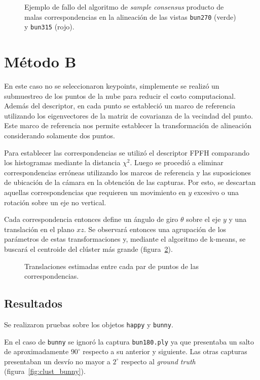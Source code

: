 			\begin{figure}
				\caption{\label{fig:align_sac}Ejemplo de fallo del algoritmo de \emph{sample consensus} producto de malas correspondencias
				en la alineación de las vistas
				\texttt{bun270} (verde) y \texttt{bun315} (rojo).}
			\end{figure}


	\section{Método B}
		En este caso no se seleccionaron keypoints, simplemente se realizó un submuestreo de
		los puntos de la nube para reducir el costo computacional.
		Además del descriptor, en cada punto se estableció un marco de referencia utilizando los
		eigenvectores de la matriz de covarianza de la vecindad del punto. Este
		marco de referencia nos permite establecer
		la transformación de alineación considerando solamente dos puntos\cite{ISS}.

		Para establecer las correspondencias se utilizó el descriptor FPFH
		comparando los histogramas mediante la distancia $\chi^2$.  Luego se
		procedió a eliminar correspondencias erróneas utilizando los marcos de
		referencia y las suposiciones de ubicación de la cámara en la obtención
		de las capturas.  Por esto, se descartan aquellas correspondencias que
		requieren un movimiento en $y$ excesivo o una rotación sobre un eje no
		vertical. 

		Cada correspondencia entonces define un ángulo de giro $\theta$ sobre
		el eje $y$ y una translación en el plano $xz$.  Se observará entonces
		una agrupación de los parámetros de estas transformaciones y, mediante el
		algoritmo de k-means, se buscará el centroide del clúster más grande (figura~\ref{fig:cluster}).
		\begin{figure}
			\caption{\label{fig:cluster}Translaciones estimadas entre cada par
			de puntos de las correspondencias.}
		\end{figure}

		\subsection{Resultados}
			Se realizaron pruebas sobre los objetos \texttt{happy} y \texttt{bunny}.

			En el caso de \texttt{bunny} se ignoró la captura
			\texttt{bun180.ply} ya que presentaba un salto de aproximadamente
			$90^{\circ}$ respecto a su anterior y siguiente.  Las otras
			capturas presentaban un desvío no mayor a $2^{\circ}$ respecto al
			\emph{ground truth} (figura~\ref{fig:clust_bunny}).

